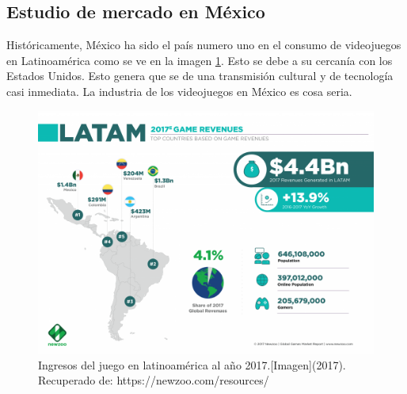 			 
\subsection{Estudio de mercado en México}

Históricamente, México ha sido el país numero uno en el consumo de videojuegos en Latinoamérica como se ve en la imagen \ref{fig:mexicoUno}. Esto se debe a su cercanía con los Estados Unidos. Esto genera que se de una transmisión cultural y de tecnología casi inmediata. La industria de los videojuegos en México es cosa seria. 
\\[1pt] 
	\begin{figure}
	\centering
	\includegraphics[width=\textwidth]{03MarcoTeorico/imageR/mexicoUno.png}
	\caption{Ingresos del juego en latinoamérica al año 2017.[Imagen](2017). Recuperado de: https://newzoo.com/resources/}
	\label{fig:mexicoUno}
	\end{figure}

